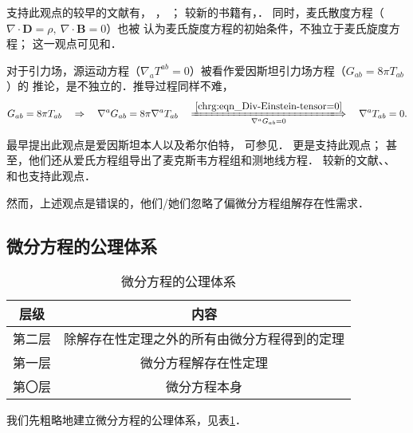 支持此观点的较早的文献有\textcite[\S 30]{landau_2-classical-fields}，
\textcite[\S 18.1-18.3]{feynman-2006-v2}，
\textcite[\S 24]{pauli-1973-ED}；
较新的书籍有\textcite[p.3]{jackson1998}，\textcite[\S 8.1]{griffiths-2023}．
同时，麦氏散度方程（$\nabla\cdot \boldsymbol{D}=\rho,\ \nabla \cdot \boldsymbol{B}=0$）也被
认为麦氏旋度方程的初始条件，不独立于麦氏旋度方程；
这一观点可见\textcite[p.6]{stratton1941}和\textcite[p.603]{courant_hilbert-v2}．




对于引力场，源运动方程（$\nabla_a T^{ab}=0$）被看作爱因斯坦引力场方程（$G_{ab}=8\pi T_{ab}$）的
推论，是不独立的．推导过程同样不难，
\begin{equation}
    G_{ab}=8\pi T_{ab} \quad \Rightarrow \quad
    \nabla^a G_{ab}=8\pi \nabla^a T_{ab}
    \quad \xLongrightarrow[\nabla^a G_{ab}=0]{\ref{chrg:eqn_Div-Einstein-tensor=0}} \quad
    \nabla^a T_{ab}=0 .
\end{equation}

最早提出此观点是爱因斯坦\cite{einstein_infeld_1949}本人以及希尔伯特，
可参见\parencite[\S 15(c)]{Pais-1982}．
\textcite[\S 17.1-17.2]{mtw1973}更是支持此观点；
甚至，他们\cite[\S 20.6]{mtw1973}还从爱氏方程组导出了麦克斯韦方程组和测地线方程．
较新的文献\textcite[\S 6.6]{schutz-2022}、\textcite[\S 5.4]{poisson-will-2014}、
\textcite[\S 9.3]{witten-2024}和\textcite[p.44]{Choquet-Bruhat-2009}也支持此观点．

然而，上述观点是错误的\cite{liu2018}，他们/她们忽略了偏微分方程组解存在性需求．

\subsection{微分方程的公理体系}


\begin{table}[htb]
    \centering
    \caption{微分方程的公理体系} \label{chfd:tab-diff-axiom}
    \begin{tabular}{|*2{c|}}
        \hline
        层级 & 内容 \\ \hline
        第二层 & 除解存在性定理之外的所有由微分方程得到的定理  \\ \hline
        第一层 & 微分方程解存在性定理 \\ \hline
        第〇层 & 微分方程本身   \\ \hline
    \end{tabular}
\end{table}

我们先粗略地建立微分方程的公理体系，见表\ref{chfd:tab-diff-axiom}．

